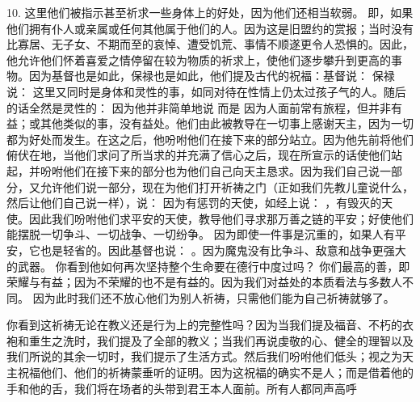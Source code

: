 10.  这里他们被指示甚至祈求一些身体上的好处，因为他们还相当软弱。 即，如果他们拥有仆人或亲属或任何其他属于他们的人。因为这是旧盟约的赏报；当时没有比寡居、无子女、不期而至的哀悼、遭受饥荒、事情不顺遂更令人恐惧的。因此，他允许他们怀着喜爱之情停留在较为物质的祈求上，使他们逐步攀升到更高的事物。因为基督也是如此，保禄也是如此，他们提及古代的祝福：基督说： 保禄说：  这里又同时是身体和灵性的事，如同对待在性情上仍太过孩子气的人。随后的话全然是灵性的： 因为他并非简单地说 而是 因为人面前常有旅程，但并非有益；或其他类似的事，没有益处。他们由此被教导在一切事上感谢天主，因为一切都为好处而发生。在这之后，他吩咐他们在接下来的部分站立。因为他先前将他们俯伏在地，当他们求问了所当求的并充满了信心之后，现在所宣示的话使他们站起，并吩咐他们在接下来的部分也为他们自己向天主恳求。因为我们自己说一部分，又允许他们说一部分，现在为他们打开祈祷之门（正如我们先教儿童说什么，然后让他们自己说一样），说： 因为有惩罚的天使，如经上说： ，有毁灭的天使。因此我们吩咐他们求平安的天使，教导他们寻求那万善之链的平安；好使他们能摆脱一切争斗、一切战争、一切纷争。 因为即使一件事是沉重的，如果人有平安，它也是轻省的。因此基督也说： 。因为魔鬼没有比争斗、敌意和战争更强大的武器。 你看到他如何再次坚持整个生命要在德行中度过吗？ 你们最高的善，即荣耀与有益；因为不荣耀的也不是有益的。因为我们对益处的本质看法与多数人不同。 因为此时我们还不放心他们为别人祈祷，只需他们能为自己祈祷就够了。\par

你看到这祈祷无论在教义还是行为上的完整性吗？因为当我们提及福音、不朽的衣袍和重生之洗时，我们提及了全部的教义；当我们再说虔敬的心、健全的理智以及我们所说的其余一切时，我们提示了生活方式。然后我们吩咐他们低头；视之为天主祝福他们、他们的祈祷蒙垂听的证明。因为这祝福的确实不是人；而是借着他的手和他的舌，我们将在场者的头带到君王本人面前。所有人都同声高呼\par

